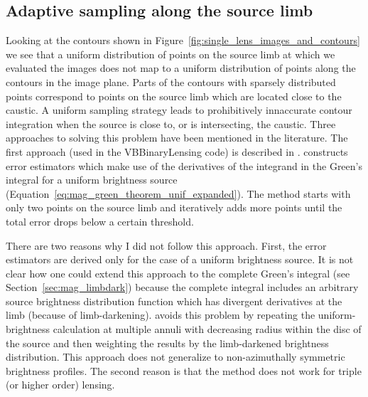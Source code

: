 \documentclass[12pt,dvipsnames]{report}
\newcommand{\ssf}[1]{\textsf{#1}}
\begin{document}
\subsection{Adaptive sampling along the source limb}
\label{ssec:adaptive_sampling}
Looking at the contours shown in  Figure~\ref{fig:single_lens_images_and_contours}
we see that a uniform distribution of points on the source limb at which we evaluated the images
does not map to a uniform distribution of points along the contours in the image plane. 
Parts of the contours with sparsely distributed points correspond to points on the source 
limb which are located close
to the caustic. A uniform sampling strategy leads to prohibitively innaccurate contour 
integration when the source is close to, or is intersecting, the caustic. 
Three approaches to solving this problem have been mentioned in the literature.
The first approach (used in the \ssf{VBBinaryLensing} code) is described in 
\citet{2010MNRAS.408.2188B}. \citet{2010MNRAS.408.2188B} constructs error estimators 
which make use of the  derivatives of the integrand in the Green's integral for a 
uniform brightness source (Equation~\ref{eq:mag_green_theorem_unif_expanded}).
The method starts with only two points on the source limb and iteratively 
adds more points until the total error drops below a certain threshold. 

There are two reasons why I did not follow this approach. First, the error estimators are 
derived only for the case of a uniform brightness source. It is not clear how one could 
extend this approach to the complete Green's integral (see Section~\ref{sec:mag_limbdark})
because the complete integral includes an arbitrary source brightness distribution 
function which has divergent derivatives at the limb (because of limb-darkening). 
\citet{2010MNRAS.408.2188B} avoids this problem by repeating the uniform-brightness 
calculation at multiple annuli with decreasing radius within the disc of the source 
and then weighting the results by the limb-darkened brightness distribution.
This approach does not generalize to non-azimuthally symmetric brightness 
profiles. The second reason is that the \citet{2010MNRAS.408.2188B} method does not work 
for triple (or higher order) lensing.
\end{document}
